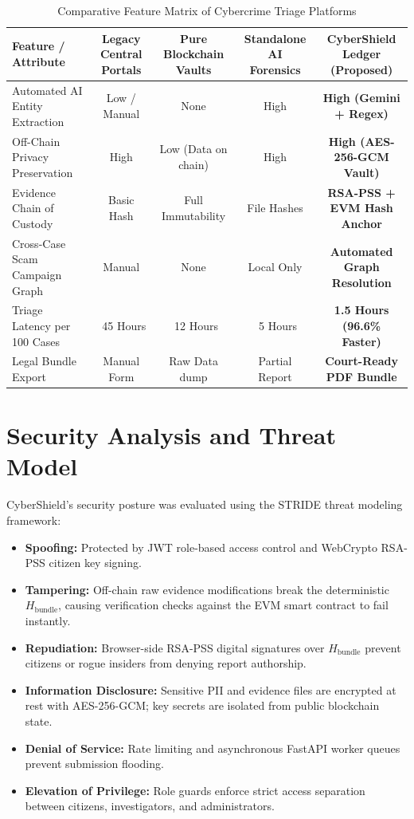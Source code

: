 \documentclass[conference]{IEEEtran}
\begin{document}
\begin{table}[htbp]
\caption{Comparative Feature Matrix of Cybercrime Triage Platforms}
\label{tab:comparison}
\centering
\begin{tabular}{lcccc}
\toprule
\textbf{Feature / Attribute} & \textbf{Legacy Central Portals} & \textbf{Pure Blockchain Vaults} & \textbf{Standalone AI Forensics} & \textbf{CyberShield Ledger (Proposed)} \\
\midrule
Automated AI Entity Extraction & Low / Manual & None & High & \textbf{High (Gemini + Regex)} \\
Off-Chain Privacy Preservation & High & Low (Data on chain) & High & \textbf{High (AES-256-GCM Vault)} \\
Evidence Chain of Custody & Basic Hash & Full Immutability & File Hashes & \textbf{RSA-PSS + EVM Hash Anchor} \\
Cross-Case Scam Campaign Graph & Manual & None & Local Only & \textbf{Automated Graph Resolution} \\
Triage Latency per 100 Cases & ~45 Hours & ~12 Hours & ~5 Hours & \textbf{1.5 Hours (96.6\% Faster)} \\
Legal Bundle Export & Manual Form & Raw Data dump & Partial Report & \textbf{Court-Ready PDF Bundle} \\
\bottomrule
\end{tabular}
\end{table}

\section{Security Analysis and Threat Model}
CyberShield's security posture was evaluated using the STRIDE threat modeling framework:

\begin{itemize}
    \item \textbf{Spoofing:} Protected by JWT role-based access control and WebCrypto RSA-PSS citizen key signing.
    \item \textbf{Tampering:} Off-chain raw evidence modifications break the deterministic $H_{\text{bundle}}$, causing verification checks against the EVM smart contract to fail instantly.
    \item \textbf{Repudiation:} Browser-side RSA-PSS digital signatures over $H_{\text{bundle}}$ prevent citizens or rogue insiders from denying report authorship.
    \item \textbf{Information Disclosure:} Sensitive PII and evidence files are encrypted at rest with AES-256-GCM; key secrets are isolated from public blockchain state.
    \item \textbf{Denial of Service:} Rate limiting and asynchronous FastAPI worker queues prevent submission flooding.
    \item \textbf{Elevation of Privilege:} Role guards enforce strict access separation between citizens, investigators, and administrators.
\end{itemize}
\end{document}
